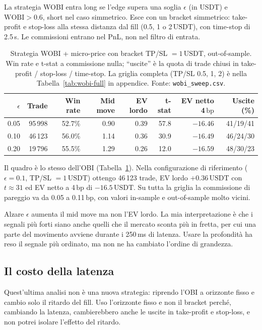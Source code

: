 \documentclass[a4paper,11pt]{article}
\newcommand{\WOBI}{\mathrm{WOBI}}
\newcommand{\bp}{\ensuremath{\,\mathrm{bp}}}
\newcommand{\usdt}{\ensuremath{\,\mathrm{USDT}}}
\newcommand{\code}[1]{\texttt{#1}}
\begin{document}
La strategia WOBI entra long se l'edge supera una soglia $\epsilon$ (in USDT) e
$\WOBI > 0.6$, short nel caso simmetrico. Esce con un bracket simmetrico: take-profit e
stop-loss alla stessa distanza dal fill (0.5, 1 o 2\usdt{}), con time-stop di 2.5\,s. Le
commissioni entrano nel PnL, non nel filtro di entrata.

\begin{table}[H]
\centering
\footnotesize
\caption{Strategia WOBI + micro-price con bracket TP/SL $=1$\usdt{}, out-of-sample. Win rate e
t-stat a commissione nulla; ``uscite'' è la quota di trade chiusi in take-profit / stop-loss /
time-stop. La griglia completa (TP/SL 0.5, 1, 2) è nella Tabella~\ref{tab:wobi-full} in
appendice. Fonte: \code{wobi\_sweep.csv}.}
\label{tab:wobi}
\begin{tabular}{@{}rrrrrrrr@{}}
\toprule
$\epsilon$ & Trade & Win rate & Mid move & EV lordo & t-stat & EV netto 4\bp & Uscite (\%) \\
\midrule
0.05 & 95\,998 & 52.7\% & 0.90 & 0.39 & 57.8 & $-16.46$ & 41/19/41 \\
0.10 & 46\,123 & 56.0\% & 1.14 & 0.36 & 30.9 & $-16.49$ & 46/24/30 \\
0.20 & 19\,796 & 55.5\% & 1.29 & 0.26 & 12.0 & $-16.59$ & 48/30/23 \\
\bottomrule
\end{tabular}
\end{table}

Il quadro è lo stesso dell'OBI (Tabella~\ref{tab:wobi}). Nella configurazione di riferimento ($\epsilon = 0.1$, TP/SL
$= 1$\usdt{}) ottengo 46\,123 trade, EV lordo $+0.36\usdt{}$ con $t \approx 31$ ed EV netto a
4\bp{} di $-16.5\usdt{}$. Su tutta la griglia la commissione di pareggio va da 0.05 a
0.11\bp{}, con valori in-sample e out-of-sample molto vicini.

Alzare $\epsilon$ aumenta il mid move ma non l'EV lordo. La mia interpretazione è che i segnali
più forti siano anche quelli che il mercato sconta più in fretta, per cui una parte del
movimento avviene durante i 250\,ms di latenza. Usare la profondità ha reso il segnale più
ordinato, ma non ne ha cambiato l'ordine di grandezza.

\subsection{Il costo della latenza}
\label{sec:ris-latenza}

Quest'ultima analisi non è una nuova strategia: riprendo l'OBI a orizzonte fisso e cambio solo
il ritardo del fill. Uso l'orizzonte fisso e non il bracket perché, cambiando la latenza,
cambierebbero anche le uscite in take-profit e stop-loss, e non potrei isolare l'effetto del
ritardo.
\end{document}

